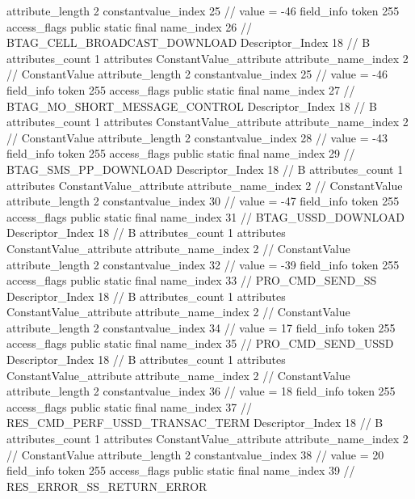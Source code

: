 {{{{{{{					attribute_length	2
					constantvalue_index	25		// value = -46
				}
				}
			}
			field_info {
				token	255
				access_flags	public static final
				name_index	26		// BTAG_CELL_BROADCAST_DOWNLOAD
				Descriptor_Index	18		// B
				attributes_count	1
				attributes {
				ConstantValue_attribute {
					attribute_name_index	2		// ConstantValue
					attribute_length	2
					constantvalue_index	25		// value = -46
				}
				}
			}
			field_info {
				token	255
				access_flags	public static final
				name_index	27		// BTAG_MO_SHORT_MESSAGE_CONTROL
				Descriptor_Index	18		// B
				attributes_count	1
				attributes {
				ConstantValue_attribute {
					attribute_name_index	2		// ConstantValue
					attribute_length	2
					constantvalue_index	28		// value = -43
				}
				}
			}
			field_info {
				token	255
				access_flags	public static final
				name_index	29		// BTAG_SMS_PP_DOWNLOAD
				Descriptor_Index	18		// B
				attributes_count	1
				attributes {
				ConstantValue_attribute {
					attribute_name_index	2		// ConstantValue
					attribute_length	2
					constantvalue_index	30		// value = -47
				}
				}
			}
			field_info {
				token	255
				access_flags	public static final
				name_index	31		// BTAG_USSD_DOWNLOAD
				Descriptor_Index	18		// B
				attributes_count	1
				attributes {
				ConstantValue_attribute {
					attribute_name_index	2		// ConstantValue
					attribute_length	2
					constantvalue_index	32		// value = -39
				}
				}
			}
			field_info {
				token	255
				access_flags	public static final
				name_index	33		// PRO_CMD_SEND_SS
				Descriptor_Index	18		// B
				attributes_count	1
				attributes {
				ConstantValue_attribute {
					attribute_name_index	2		// ConstantValue
					attribute_length	2
					constantvalue_index	34		// value = 17
				}
				}
			}
			field_info {
				token	255
				access_flags	public static final
				name_index	35		// PRO_CMD_SEND_USSD
				Descriptor_Index	18		// B
				attributes_count	1
				attributes {
				ConstantValue_attribute {
					attribute_name_index	2		// ConstantValue
					attribute_length	2
					constantvalue_index	36		// value = 18
				}
				}
			}
			field_info {
				token	255
				access_flags	public static final
				name_index	37		// RES_CMD_PERF_USSD_TRANSAC_TERM
				Descriptor_Index	18		// B
				attributes_count	1
				attributes {
				ConstantValue_attribute {
					attribute_name_index	2		// ConstantValue
					attribute_length	2
					constantvalue_index	38		// value = 20
				}
				}
			}
			field_info {
				token	255
				access_flags	public static final
				name_index	39		// RES_ERROR_SS_RETURN_ERROR
}}}}}
